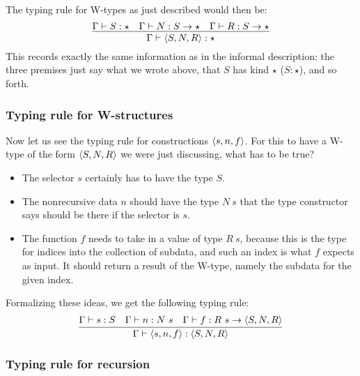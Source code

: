 \documentclass{article}
\begin{document}
The typing rule for W-types as just described would then be:
\[
\infer{ \Gamma \vdash \w{S}{N}{R} : \star}{\Gamma \vdash S : \star & \Gamma \vdash N : S \to \star  & \Gamma \vdash R : S \to \star }
\]
\noindent This records exactly the same information as in the informal
description: the three premises just say what we wrote above, that $S$
has kind $\star$ ($S : \star$), and so forth.  

\subsubsection{Typing rule for W-structures}

Now let us see the typing rule for constructions $\langle s , n, f \rangle$.  For this
to have a W-type of the form $\langle S , N , R \rangle$ we were just discussing, what has
to be true?

\begin{itemize}
\item The selector $s$ certainly has to have the type $S$.
\item The nonrecursive data $n$ should have the type $N\ s$ that
  the type constructor says should be there if the selector is $s$.
\item The function $f$ needs to take in a value of type $R\ s$,
  because this is the type for indices into the collection of subdata,
  and such an index is what $f$ expects as input. It should return a
  result of the W-type, namely the subdata for the given index.
\end{itemize}

Formalizing these ideas, we get the following typing rule:
\[
\infer{\Gamma \vdash \ctor{s}{n}{f} : \w{S}{N}{R}}
      {\Gamma \vdash s : S & \Gamma \vdash n : N\ s & \Gamma \vdash f : R\ s \to \w{S}{N}{R}}
      \]
      
\subsubsection{Typing rule for recursion}
\end{document}
